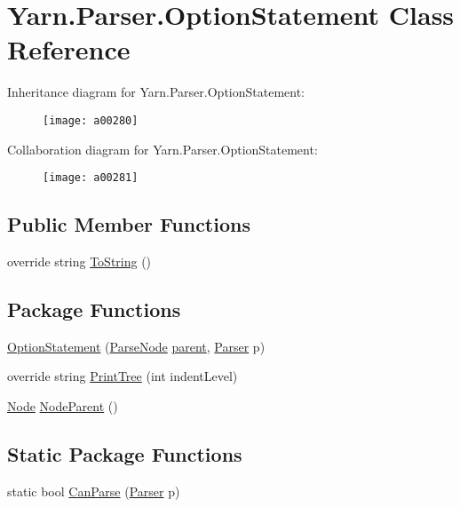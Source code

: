 \hypertarget{a00061}{\section{Yarn.\-Parser.\-Option\-Statement Class Reference}
\label{a00061}
}


Inheritance diagram for Yarn.\-Parser.\-Option\-Statement\-:
\nopagebreak
\begin{figure}[H]
\begin{center}
\leavevmode
\texttt{[image: a00280]}
\end{center}
\end{figure}


Collaboration diagram for Yarn.\-Parser.\-Option\-Statement\-:
\nopagebreak
\begin{figure}[H]
\begin{center}
\leavevmode
\texttt{[image: a00281]}
\end{center}
\end{figure}
\subsection*{Public Member Functions}
\begin{DoxyCompactItemize}
\item 
override string \hyperlink{a00063_a18c67cb16090d0889bb9d6c8c6c565f8}{To\-String} ()
\end{DoxyCompactItemize}
\subsection*{Package Functions}
\begin{DoxyCompactItemize}
\item 
\hyperlink{a00061_ad18938712d01cf71edbc75d4974cd0e0}{Option\-Statement} (\hyperlink{a00063}{Parse\-Node} \hyperlink{a00063_af313a82103fcc2ff5a177dbb06b92f7b}{parent}, \hyperlink{a00064}{Parser} p)
\item 
override string \hyperlink{a00061_aafba8c941dbd3d0ef841ac9d472e1ba3}{Print\-Tree} (int indent\-Level)
\item 
\hyperlink{a00054}{Node} \hyperlink{a00063_a580e520a29444fc23ac3660cbe514a09}{Node\-Parent} ()
\end{DoxyCompactItemize}
\subsection*{Static Package Functions}
\begin{DoxyCompactItemize}
\item 
static bool \hyperlink{a00061_a1ffeca22df52451120cb362f90fd4e9f}{Can\-Parse} (\hyperlink{a00064}{Parser} p)
\end{DoxyCompactItemize}
